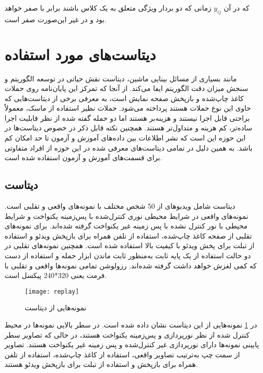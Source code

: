 که در آن 
$y_{ij}$
  زمانی که دو بردار ویژگی متعلق به یک کلاس باشند برابر با صفر خواهد بود و در غیر این‌صورت صفر است.
  \section{دیتاست‌های مورد استفاده}
  مانند بسیاری از مسائل بینایی ماشین، دیتاست نقش حیاتی در توسعه الگوریتم و سنجش میزان دقت الگوریتم ایفا می‌کند. از آنجا که تمرکز این پایان‌نامه روی حملات کاغذ چاپ‌شده و بازپخش صفحه نمایش است، به معرفی برخی از دیتاست‌هایی که حاوی این نوع حملات هستند پرداخته می‌شود. حملات نظیر استفاده از ماسک، معمولاً براحتی قابل اجرا نیستند و هزینه‌بر هستند اما دو حمله گفته شده از نظر قابلیت اجرا ساده‌تر، کم هزینه و متداول‌تر هستند. همچنین نکته قابل ذکر در خصوص دیتاست‌ها در این حوزه این است که نشر اطلاعات بین داده‌های آموزش و آزمون تا حد امکان کم باشد. به همین دلیل در تمامی دیتاست‌های معرفی شده در این حوزه از افراد متفاوتی برای قسمت‌های آموزش و آزمون استفاده شده است.
\subsection{دیتاست }
دیتاست
 \cite{chingovska2012effectiveness}
شامل ویدیوهای از 50 شخص مختلف با نمونه‌های واقعی و تقلبی است. نمونه‌های واقعی در شرایط محیطی نوری کنترل‌شده با پس‌زمینه یکنواخت و شرایط محیطی با نور کنترل نشده با پس زمینه غیر یکنواخت گرفته شده‌اند. برای نمونه‌های تقلبی از صفحه کاغذ چاپ‌شده، استفاده از تلفن همراه برای بازپخش ویدئو و استفاده از تبلت  برای پخش ویدئو با کیفیت بالا استفاده شده است. همچنین نمونه‌های تقلبی در دو حالت استفاده از یک پایه ثابت به‌منظور ثابت ماندن ابزار حمله و استفاده از دست که کمی لغزش خواهد داشت گرفته شده‌اند. رزولوشن تمامی نمونه‌ها واقعی و تقلبی با فرمت  یعنی 320*240 پیکسل است.
\begin{figure}[h]
 	\centerline{\texttt{[image: replay]}}
 	\caption{نمونه‌هایی از دیتاست  \cite{chingovska2012effectiveness} }
 	\label{fig:replay}
\end{figure}
در
\ref{fig:replay}
نمونه‌هایی از این دیتاست نشان داده شده است. در سطر بالایی نمونه‌ها در محیط کنترل شده از نظر نورپردازی و پس‌زمینه یکنواخت هستند، در حالی که تصاویر سطر پایینی نمونه‌ها دارای نورپردازی غیر کنترل‌شده و پس زمینه غیر یکنواخت هستند. تصاویر از سمت چپ به‌ترتیب تصاویر واقعی، استفاده از کاغذ چاپ‌شده، استفاده از تلفن همراه برای بازپخش و استفاده از تبلت برای بازپخش ویدئو هستند.
